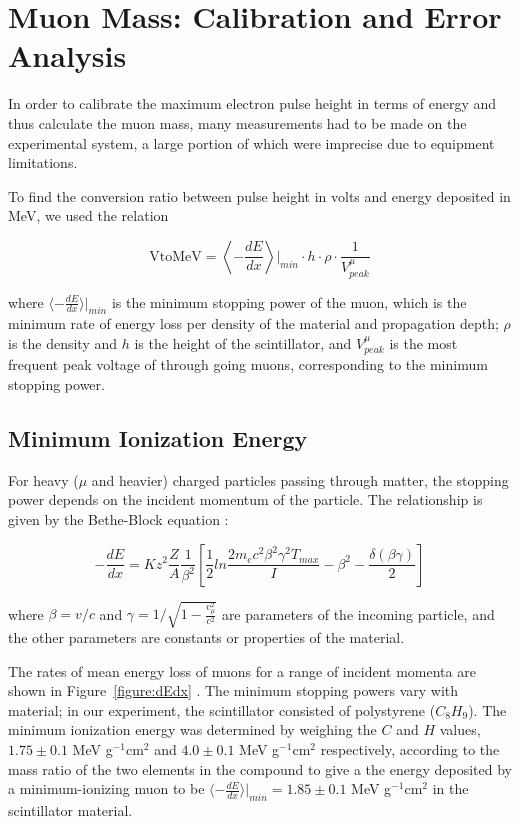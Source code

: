 
\section{Muon Mass: Calibration and Error Analysis}\label{masscalibration}

In order to calibrate the maximum electron pulse height in terms of
energy and thus calculate the muon mass, many measurements had to be
made on the experimental system, a large portion of which were
imprecise due to equipment limitations.

To find the conversion ratio between pulse height in volts and energy
deposited in MeV, we used the relation

\begin{equation} \mathrm{VtoMeV} = \left\langle -\frac{dE}{dx}\right\rangle\left.\right|_{min} \cdot h\cdot\rho\cdot\frac{1}{V_{peak}^{\mu}}\end{equation}   

where $\langle -\frac{dE}{dx}\rangle|_{min}$ is the minimum stopping
power of the muon, which is the minimum rate of energy loss per
density of the material and propagation depth; $\rho$ is the density
and $h$ is the height of the scintillator, and $V_{peak}^{\mu}$ is the
most frequent peak voltage of through going muons, corresponding to
the minimum stopping power.

\subsection{Minimum Ionization Energy}\label{minimumionizationenergy}

For heavy ($\mu$ and heavier) charged particles passing through
matter, the stopping power depends on the incident momentum of the
particle. The relationship is given by the Bethe-Block equation
\cite{yao}:

\begin{equation}
-\frac{dE}{dx} = Kz^2\frac{Z}{A}\frac{1}{\beta^2}\left[\frac{1}{2}ln\frac{2m_ec^2\beta^2\gamma^2T_{max}}{I} - \beta^2 - \frac{\delta(\beta\gamma)}{2}\right]
\end{equation}

where $\beta = v/c$ and $\gamma = 1/\sqrt{1 - \frac{v_{\mu}^2}{c^2}}$
are parameters of the incoming particle, and the other parameters are
constants or properties of the material.

The rates of mean energy loss of muons for a range of incident momenta
are shown in Figure~\ref{figure:dEdx} \cite{yao}. The minimum stopping
powers vary with material; in our experiment, the scintillator
consisted of polystyrene ($C_8H_9$). The minimum ionization energy was
determined by weighing the $C$ and $H$ values, $1.75\pm 0.1$ MeV
g$^{-1}$cm$^{2}$ and $4.0\pm 0.1$ MeV g$^{-1}$cm$^{2}$ respectively,
according to the mass ratio of the two elements in the compound to
give a the energy deposited by a minimum-ionizing muon to be $\langle
-\frac{dE}{dx}\rangle|_{min}= 1.85 \pm 0.1$ MeV g$^{-1}$cm$^{2}$ in
the scintillator material.

